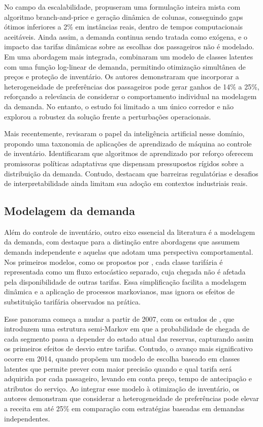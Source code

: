 No campo da escalabilidade, \citep{MENDEZDIAZ2014} propuseram uma formulação inteira mista com algoritmo branch-and-price e geração dinâmica de colunas, conseguindo gaps ótimos inferiores a 2\% em instâncias reais, dentro de tempos computacionais aceitáveis. Ainda assim, a demanda continua sendo tratada como exógena, e o impacto das tarifas dinâmicas sobre as escolhas dos passageiros não é modelado. Em uma abordagem mais integrada, \citep{HETRAKUL201468} combinaram um modelo de classes latentes com uma função log-linear de demanda, permitindo otimização simultânea de preços e proteção de inventário. Os autores demonstraram que incorporar a heterogeneidade de preferências dos passageiros pode gerar ganhos de 14\% a 25\%, reforçando a relevância de considerar o comportamento individual na modelagem da demanda. No entanto, o estudo foi limitado a um único corredor e não explorou a robustez da solução frente a perturbações operacionais.

Mais recentemente, \citep{Besinovic2022} revisaram o papel da inteligência artificial nesse domínio, propondo uma taxonomia de aplicações de aprendizado de máquina ao controle de inventário. Identificaram que algoritmos de aprendizado por reforço oferecem promissoras políticas adaptativas que dispensam pressupostos rígidos sobre a distribuição da demanda. Contudo, destacam que barreiras regulatórias e desafios de interpretabilidade ainda limitam sua adoção em contextos industriais reais.

\subsection{Modelagem da demanda}

Além do controle de inventário, outro eixo essencial da literatura é a modelagem da demanda, com destaque para a distinção entre abordagens que assumem demanda independente e aquelas que adotam uma perspectiva comportamental. Nos primeiros modelos, como os propostos por \citep{Dana1999, Feng2001}, cada classe tarifária é representada como um fluxo estocástico separado, cuja chegada não é afetada pela disponibilidade de outras tarifas. Essa simplificação facilita a modelagem dinâmica e a aplicação de processos markovianos, mas ignora os efeitos de substituição tarifária observados na prática.

Esse panorama começa a mudar a partir de 2007, com os estudos de \citep{Walczak2007}, que introduzem uma estrutura semi-Markov em que a probabilidade de chegada de cada segmento passa a depender do estado atual das reservas, capturando assim os primeiros efeitos de desvio entre tarifas. Contudo, o avanço mais significativo ocorre em 2014, quando \citep{HETRAKUL201468} propõem um modelo de escolha baseado em classes latentes que permite prever com maior precisão quando e qual tarifa será adquirida por cada passageiro, levando em conta preço, tempo de antecipação e atributos do serviço. Ao integrar esse modelo à otimização de inventário, os autores demonstram que considerar a heterogeneidade de preferências pode elevar a receita em até 25\% em comparação com estratégias baseadas em demandas independentes.

